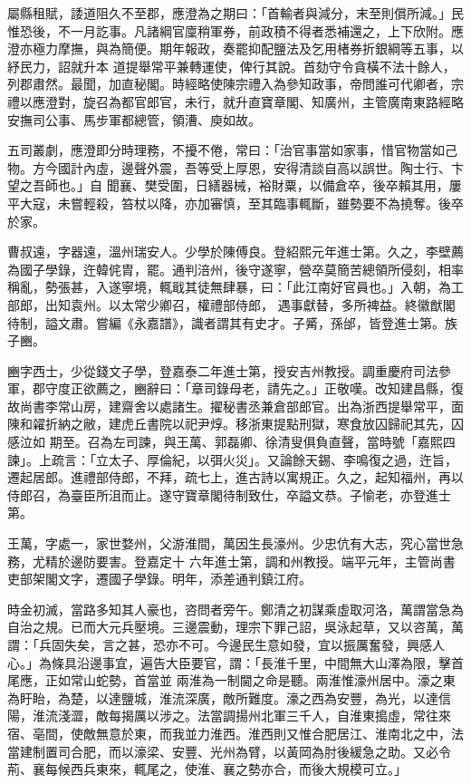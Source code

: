 \begin{pinyinscope}
 屬縣租賦，諉道阻久不至郡，應澄為之期曰：「首輸者與減分，末至則償所減。」民惟恐後，不一月訖事。凡諸綱官廩稍軍券，前政積不得者悉補還之，上下欣附。應澄亦極力摩撫，與為簡便。期年報政，奏罷抑配鹽法及乞用楮券折銀綱等五事，以紓民力，詔就升本
 道提舉常平兼轉運使，俾行其說。首劾守令貪橫不法十餘人，列郡肅然。最聞，加直秘閣。時經略使陳宗禮入為參知政事，帝問誰可代卿者，宗禮以應澄對，旋召為都官郎官，未行，就升直寶章閣、知廣州，主管廣南東路經略安撫司公事、馬步軍都總管，領漕、庾如故。



 五司叢劇，應澄即分時理務，不擾不倦，常曰：「治官事當如家事，惜官物當如己物。方今國計內虛，邊聲外震，吾等受上厚恩，安得清談自高以誤世。陶士行、卞望之吾師也。」自
 聞襄、樊受圍，日繕器械，裕財粟，以備倉卒，後卒賴其用，屢平大寇，未嘗輕殺，笞杖以降，亦加審慎，至其臨事輒斷，雖勢要不為撓奪。後卒於家。



 曹叔遠，字器遠，溫州瑞安人。少學於陳傅良。登紹熙元年進士第。久之，李壁薦為國子學錄，迕韓侂胄，罷。通判涪州，後守遂寧，營卒莫簡苦總領所侵刻，相率稱亂，勢張甚，入遂寧境，輒戢其徒無肆暴，曰：「此江南好官員也。」入朝，為工部郎，出知袁州。以太常少卿召，權禮部侍郎，
 遇事獻替，多所裨益。終徽猷閣待制，謚文肅。嘗編《永嘉譜》，識者謂其有史才。子觱，孫邰，皆登進士第。族子豳。



 豳字西士，少從錢文子學，登嘉泰二年進士第，授安吉州教授。調重慶府司法參軍，郡守度正欲薦之，豳辭曰：「章司錄母老，請先之。」正敬嘆。改知建昌縣，復故尚書李常山房，建齋舍以處諸生。擢秘書丞兼倉部郎官。出為浙西提舉常平，面陳和糴折納之敝，建虎丘書院以祀尹焞。移浙東提點刑獄，寒食放囚歸祀其先，囚感泣如
 期至。召為左司諫，與王萬、郭磊卿、徐清叟俱負直聲，當時號「嘉熙四諫」。上疏言：「立太子、厚倫紀，以弭火災」。又論餘天錫、李鳴復之過，迕旨，遷起居郎。進禮部侍郎，不拜，疏七上，進古詩以寓規正。久之，起知福州，再以侍郎召，為臺臣所沮而止。遂守寶章閣待制致仕，卒謚文恭。子愉老，亦登進士第。



 王萬，字處一，家世婺州，父游淮間，萬因生長濠州。少忠伉有大志，究心當世急務，尤精於邊防要害。登嘉定十
 六年進士第，調和州教授。端平元年，主管尚書吏部架閣文字，遷國子學錄。明年，添差通判鎮江府。



 時金初滅，當路多知其人豪也，咨問者旁午。鄭清之初謀乘虛取河洛，萬謂當急為自治之規。已而大元兵壓境。三邊震動，理宗下罪己詔，吳泳起草，又以咨萬，萬謂：「兵固失矣，言之甚，恐亦不可。今邊民生意如發，宜以振厲奮發，興感人心。」為條具沿邊事宜，遍告大臣要官，謂：「長淮千里，中間無大山澤為限，擊首尾應，正如常山蛇勢，首當並
 兩淮為一制閫之命是聽。兩淮惟濠州居中。濠之東為盱眙，為楚，以達鹽城，淮流深廣，敵所難度。濠之西為安豐，為光，以達信陽，淮流淺澀，敵每揭厲以涉之。法當調揚州北軍三千人，自淮東搗虛，常往來宿、亳間，使敵無意於東，而我並力淮西。淮西則又惟合肥居江、淮南北之中，法當建制置司合肥，而以濠梁、安豐、光州為臂，以黃岡為肘後緩急之助。又必令荊、襄每候西兵東來，輒尾之，使淮、襄之勢亦合，而後大規模可立。」




\end{pinyinscope}
